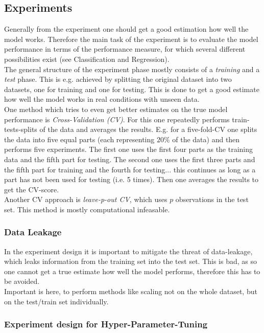 \documentclass[12pt,a4paper]{article}
\begin{document}
\subsection{Experiments}

\noindent Generally from the experiment one should get a good estimation how well the model works. Therefore the main task of the experiment is to evaluate the model performance in terms of the performance measure, for which several different possibilities exist (see Classification and Regression).\\
The general structure of the experiment phase mostly consists of a \textit{training} and a \textit{test} phase. This is e.g. achieved by splitting the original dataset into two datasets, one for training and one for testing. This is done to get a good estimate how well the model works in real conditions with unseen data.\\
One method which tries to even get better estimates on the true model performance is \textit{Cross-Validation (CV)}. For this one repeatedly performs train-tests-splits of the data and averages the results. E.g. for a five-fold-CV one splits the data into five equal parts (each representing \(20\%\) of the data) and then performs five experiments. The first one uses the first four parts as the training data and the fifth part for testing. The second one uses the first three parts and the fifth part for training and the fourth for testing... this continues as long as a part has not been used for testing (i.e. 5 times). Then one averages the results to get the CV-score.\\[1em]
Another CV approach is \textit{leave-p-out CV}, which uses \(p\) observations in the test set. This method is mostly computational infeasable.

\subsubsection{Data Leakage}

\noindent In the experiment design it is important to mitigate the threat of data-leakage, which leaks information from the training set into the test set. This is bad, as so one cannot get a true estimate how well the model performs, therefore this has to be avoided.\\
Important is here, to perform methods like scaling not on the whole dataset, but on the test/train set individually.

\subsubsection{Experiment design for Hyper-Parameter-Tuning}
\end{document}
